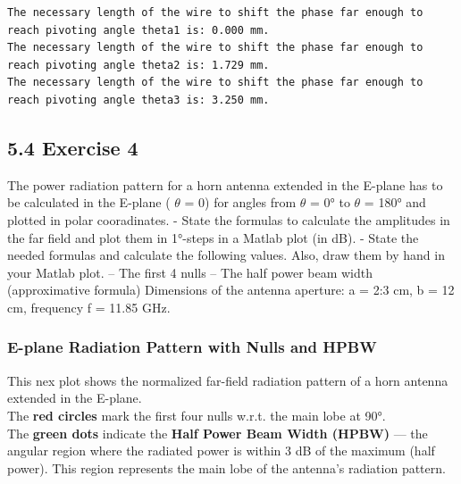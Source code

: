 \documentclass[
  letterpaper,
  DIV=11,
  numbers=noendperiod]{scrartcl}
\begin{document}
\begin{verbatim}
The necessary length of the wire to shift the phase far enough to reach pivoting angle theta1 is: 0.000 mm.
The necessary length of the wire to shift the phase far enough to reach pivoting angle theta2 is: 1.729 mm.
The necessary length of the wire to shift the phase far enough to reach pivoting angle theta3 is: 3.250 mm.
\end{verbatim}

\subsection{5.4 Exercise 4}\label{exercise-4}

The power radiation pattern for a horn antenna extended in the E-plane
has to be calculated in the E-plane ( \(\theta\) = 0) for angles from
\(\theta\) = 0° to \(\theta\) = 180° and plotted in polar cooradinates.
- State the formulas to calculate the amplitudes in the far field and
plot them in 1°-steps in a Matlab plot (in dB). - State the needed
formulas and calculate the following values. Also, draw them by hand in
your Matlab plot. -- The first 4 nulls -- The half power beam width
(approximative formula) Dimensions of the antenna aperture: a = 2:3 cm,
b = 12 cm, frequency f = 11.85 GHz.

\subsubsection{E-plane Radiation Pattern with Nulls and
HPBW}\label{e-plane-radiation-pattern-with-nulls-and-hpbw}

This nex plot shows the normalized far-field radiation pattern of a horn
antenna extended in the E-plane.\\
The \textbf{red circles} mark the first four nulls w.r.t. the main lobe
at 90°.\\
The \textbf{green dots} indicate the \textbf{Half Power Beam Width
(HPBW)} --- the angular region where the radiated power is within 3 dB
of the maximum (half power). This region represents the main lobe of the
antenna's radiation pattern.
\end{document}
